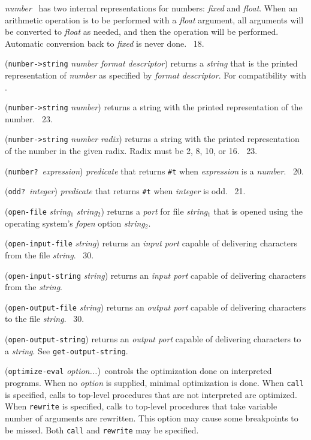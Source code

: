 \documentclass[10pt,twocolumn]{article}
\begin{document}
\emph{number} \StoC\ has two internal representations for numbers:
\emph{fixed} and \emph{float}.  When an arithmetic operation is to be
performed with a \emph{float} argument, all arguments will be
converted to \emph{float} as needed, and then the operation will be
performed.  Automatic conversion back to \emph{fixed} is never done.
\RRRRRS~18.

(\texttt{number->string} \emph{number} \emph{format descriptor})
returns a \emph{string} that is the printed representation of
\emph{number} as specified by \emph{format descriptor}.  For
compatibility with \RRRRS.

(\texttt{number->string} \emph{number}) returns a string with the
printed representation of the number.  \RRRRRS~23.

(\texttt{number->string} \emph{number} \emph{radix}) returns a string
with the printed representation of the number in the given radix.
Radix must be 2, 8, 10, or 16.  \RRRRRS~23.

(\texttt{number?}\ \emph{expression}) \emph{predicate} that returns
\texttt{\#t} when \emph{expression} is a \emph{number}.  \RRRRRS~20.

(\texttt{odd?}\ \emph{integer}) \emph{predicate} that returns
\texttt{\#t} when \emph{integer} is odd.  \RRRRRS~21.

(\texttt{open-file} \emph{string}$_1$ \emph{string}$_2$) returns a
\emph{port} for file \emph{string}$_1$ that is opened using the
operating system's \emph{fopen} option \emph{string}$_2$.

(\texttt{open-input-file} \emph{string}) returns an \emph{input port}
capable of delivering characters from the file \emph{string}.
\RRRRRS~30.

(\texttt{open-input-string} \emph{string}) returns an \emph{input
  port} capable of delivering characters from the \emph{string}.

(\texttt{open-output-file} \emph{string}) returns an \emph{output
  port} capable of delivering characters to the file \emph{string}.
\RRRRRS~30.

(\texttt{open-output-string}) returns an \emph{output port} capable of
delivering characters to a \emph{string}.  See
\texttt{get-output-string}.

(\texttt{optimize-eval} \emph{option...})\ controls the optimization
done on interpreted programs.  When no \emph{option} is supplied,
minimal optimization is done.  When \texttt{call} is specified, calls
to top-level procedures that are not interpreted are optimized.  When
\texttt{rewrite} is specified, calls to top-level procedures that take
variable number of arguments are rewritten.  This option may cause
some breakpoints to be missed.  Both \texttt{call} and
\texttt{rewrite} may be specified.
\end{document}
